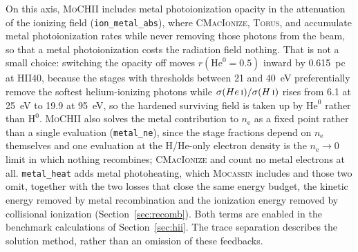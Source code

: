 \documentclass[twocolumn,linenumbers]{aastex702}
\newcommand{\code}[1]{\texttt{#1}}
\newcommand{\MoCHII}{\textsc{MoCHII}}
\newcommand{\HI}{H\,\textsc{i}}
\newcommand{\HeI}{He\,\textsc{i}}
\newcommand{\nelec}{n_{\mathrm{e}}}
\begin{document}
On this axis, \MoCHII{} includes metal photoionization opacity in the
attenuation of the ionizing field
(\code{ion\_metal\_abs}), where \textsc{CMacIonize}, \textsc{Torus}, and
\citet{wood2004} accumulate metal photoionization rates while never removing
those photons from the beam, so that a metal photoionization costs the
radiation field nothing.  That is not a small choice: switching the opacity
off moves $r(\mathrm{He}^{0}\!=\!0.5)$ inward by 0.615~pc at HII40, because
the stages with thresholds between 21 and 40~eV preferentially remove the
softest helium-ionizing photons while $\sigma(\HeI)/\sigma(\HI)$ rises from
6.1 at 25~eV to 19.9 at 95~eV, so the hardened surviving field is taken up by
$\mathrm{He}^{0}$ rather than $\mathrm{H}^{0}$.  \MoCHII{} also solves the
metal contribution to $\nelec$ as a fixed point rather than a single
evaluation (\code{metal\_ne}), since the stage fractions depend on $\nelec$
themselves and one evaluation at the H/He-only electron density is the
$\nelec \to 0$ limit in which nothing recombines; \textsc{CMacIonize} and
\citet{wood2004} count no metal electrons at all.  \code{metal\_heat} adds
metal photoheating, which \textsc{Mocassin} includes and those two omit,
together with the two losses that close the same energy budget, the
kinetic energy removed by metal recombination and the ionization energy
removed by collisional ionization (Section~\ref{sec:recomb}).
Both terms are enabled in the benchmark calculations of
Section~\ref{sec:hii}.  The trace separation describes the solution method,
rather than an omission of these feedbacks.
\end{document}
